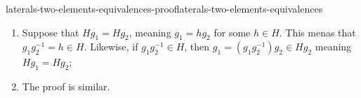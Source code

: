 \documentclass[preview]{standalone}
\begin{document}
\begin{snippetproof}{laterals-two-elements-equivalences-proof}{laterals-two-elements-equivalences}{}
    \begin{enumerate}
        \item Suppose that \(Hg_1 = Hg_2\), meaning \(g_1 = hg_2\) for some \(h\in H\).
        This menas that \(g_1g_2^{-1} = h \in H\).
        Likewise, if \(g_1g_2^{-1} \in H\), then \(g_1 = (g_1g_2^{-1})g_2 \in Hg_2\)
        meaning \(Hg_1 = Hg_2\);
        \item The proof is similar.
    \end{enumerate}
\end{snippetproof}
\end{document}
